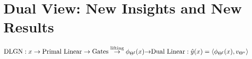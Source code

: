 \section{Dual View: New Insights and New Results}\label{sec:analysis}
{\centering $\text{DLGN} : x\rightarrow \text{Primal Linear}\rightarrow \text{Gates}\stackrel{\text{lifting}}{\rightarrow} \phi_{\Theta^{\textrm{f}}}(x) {\rightarrow}\text{Dual Linear}: \hat{y}(x)=\langle \phi_{\Theta^{\textrm{f}}}(x),v_{{\Theta}^{\text{v}}}\rangle$ \par}


